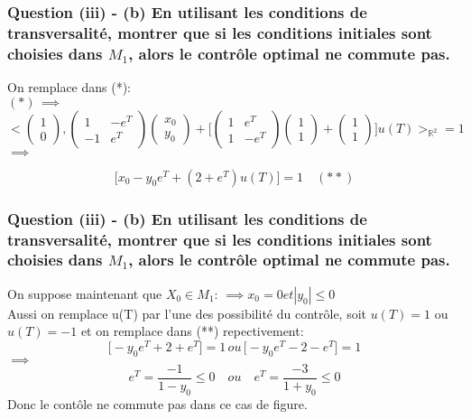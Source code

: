 \documentclass[xcolor=dvipsnames]{beamer}
\newcommand{\R}{\mathbb{R}}
\begin{document}
\begin{frame}
\frametitle{Question (iii) -  (b) En utilisant les conditions de transversalité, montrer que si les conditions initiales sont choisies dans $M_1$, alors le contrôle optimal ne commute pas.}

On remplace dans (*):\\
$(*) \, \implies $ 
 $$ <\left(\begin{matrix} 
        1\\ 
        0
      \end{matrix} \right),\left(\begin{matrix} 
        1 & -e^{T} \\ 
        -1 & e^{T}
      \end{matrix} \right)\left(\begin{matrix} 
        x_0\\ 
        y_0
      \end{matrix} \right) +  \big[\left(\begin{matrix} 
        1 & e^{T} \\ 
        1 & -e^{T}
      \end{matrix} \right)\left(\begin{matrix} 
        1\\ 
        1
      \end{matrix} \right)+ \left(\begin{matrix} 
        1\\ 
        1
      \end{matrix} \right)\big]u(T)>_{\R^2} = 1$$
$\implies $ 

$$ \big[ x_0 - y_0e^{T} + (2+e^{T})u(T) \big] = 1 \quad (**)$$
\end {frame}
\begin{frame}
\frametitle{Question (iii) -  (b) En utilisant les conditions de transversalité, montrer que si les conditions initiales sont choisies dans $M_1$, alors le contrôle optimal ne commute pas.}

On suppose maintenant que $X_0 \in M_1$:
$\implies x_0 = 0 et |y_0| \leq 0$\\
Aussi on remplace u(T) par l'une des possibilité du contrôle, soit $u(T)=1$ ou $u(T)=-1$ et
on remplace dans (**) repectivement:\\

$$ \big[ - y_0e^{T} + 2+e^{T} \big] = 1 \, ou \, \big[ - y_0e^{T} - 2-e^{T} \big] = 1$$
$\implies$ 
$$e^{T} = \frac{-1} {1- y_0} \leq 0 \quad ou \quad e^{T} = \frac{-3} {1 + y_0} \leq 0$$
\color{red}{Absurde!}
Donc le contôle ne commute pas dans ce cas de figure. \color{green}{Alors le tram s'arrêtes!}
\end {frame}
\end{document}
